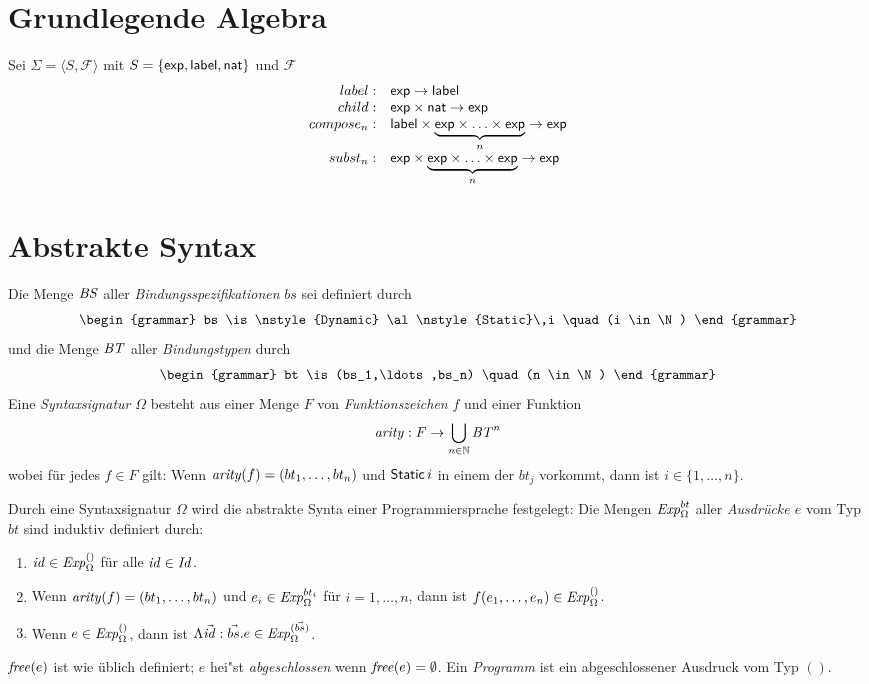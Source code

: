 \documentclass[12pt,a4paper]{article}
\begin{document}
\section*{Grundlegende Algebra}

Sei $\Sigma = \langle S, \mathcal{F} \rangle$ mit 
$S = \{\mathsf{exp},\mathsf{label},\mathsf{nat}\}$ und $\mathcal{F}$
\[\begin{array}{rl}
label:& \mathsf{exp} \to \mathsf{label}\\
child:& \mathsf{exp} \times \mathsf{nat} \to \mathsf{exp}\\
compose_n:& \mathsf{label} \times \underbrace{\mathsf{exp} \times \ldots \times \mathsf{exp}}_{n} \to \mathsf{exp}\\
subst_n:& \mathsf{exp} \times \underbrace{\mathsf{exp} \times \ldots \times \mathsf{exp}}_{n} \to \mathsf{exp}\\
\end{array}\]


\section*{Abstrakte Syntax}

Die Menge $\mathit{BS}$ aller \emph{Bindungsspezifikationen} $bs$ sei definiert durch
\[\begin{grammar}
bs
\is \nstyle{Dynamic}
\al \nstyle{Static}\,i \quad (i \in \N)
\end{grammar}\]
und die Menge $\mathit{BT}$ aller \emph{Bindungstypen} durch
\[\begin{grammar}
bt \is (bs_1,\ldots,bs_n) \quad (n \in \N)
\end{grammar}\]
Eine \emph{Syntaxsignatur} $\Omega$ besteht aus einer Menge $F$ von \emph{Funktionszeichen} $f$
und einer Funktion
\[
\mathit{arity}: F \to \bigcup_{n\in\mathbb N}\mathit{BT}^n
\]
wobei f\"ur jedes $f \in F$ gilt: Wenn $\mathit{arity}(f) = (bt_1,\ldots,bt_n)$ und
$\mathsf{Static}\,i$ in einem der $bt_j$ vorkommt, dann ist $i \in \{1,\ldots,n\}$.

Durch eine Syntaxsignatur $\Omega$ wird die abstrakte Synta einer Programmiersprache
festgelegt: Die Mengen $\mathit{Exp}^{bt}_\Omega$ aller \emph{Ausdr\"ucke $e$} vom
Typ $bt$ sind induktiv definiert durch:
\begin{enumerate}
\item $\mathit{id} \in \mathit{Exp}^{()}_\Omega$ f\"ur alle $\mathit{id} \in \mathit{Id}$.
\item Wenn $\mathit{arity}(f)=(bt_1,\ldots,bt_n)$ und $e_i \in \mathit{Exp}^{bt_i}_\Omega$ f\"ur $i=1,\ldots,n$,
  dann ist $f(e_1,\ldots,e_n) \in \mathit{Exp}^{()}_\Omega$.
\item Wenn $e \in \mathit{Exp}^{()}_\Omega$, dann ist $\Lambda \vec{\mathit{id}}:\vec{bs}.e \in \mathit{Exp}^{(\vec{bs})}_\Omega$.
\end{enumerate}
$\mathit{free}(e)$ ist wie \"ublich definiert; $e$ hei"st \emph{abgeschlossen} wenn $\mathit{free}(e) = \emptyset$.
Ein \emph{Programm} ist ein abgeschlossener Ausdruck vom Typ $()$.
\end{document}
